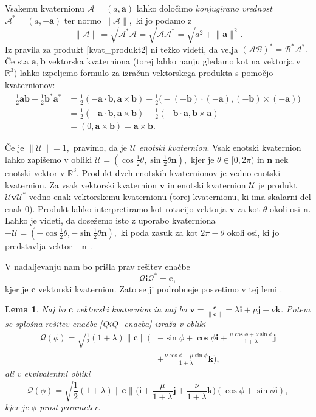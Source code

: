 \documentclass[12pt,a4paper,twoside]{article}
\theoremstyle{definition} %
\theoremstyle{plain} %
\newtheorem{lema}[definicija]{Lema}
\theoremstyle{primerstyle}
\numberwithin{equation}{section}  %
\newcommand{\R}{\mathbb R}
\newcommand{\aV}{\mathbf{a}}
\newcommand{\bV}{\mathbf{b}}
\newcommand{\cV}{\mathbf{c}}
\newcommand{\nV}{\mathbf{n}}
\newcommand{\iV}{\mathbf{i}}
\newcommand{\jV}{\mathbf{j}}
\newcommand{\kV}{\mathbf{k}}
\newcommand{\vV}{\mathbf{v}}
\newcommand{\AQ}{\mathcal{A}}
\newcommand{\BQ}{\mathcal{B}}
\newcommand{\QQ}{\mathcal{Q}}
\newcommand{\UQ}{\mathcal{U}}
\begin{document}
Vsakemu kvaternionu $\AQ=(a,\aV)$ lahko določimo \emph{konjugirano vrednost} $\AQ^*=(a,-\aV)$ ter normo $\lVert\AQ\rVert,$ ki jo podamo z
\begin{equation}
	\label{kvat_norma}
	\lVert\AQ\rVert=\sqrt{\AQ^*\AQ}=\sqrt{\AQ\AQ^*}=\sqrt{a^2+\lVert\aV\rVert^2}.
\end{equation}
Iz pravila za produkt \eqref{kvat_produkt2} ni težko videti, da velja $(\AQ\BQ)^*=\BQ^*\AQ^*.$ Če sta $\aV,\bV$ vektorska kvaterniona (torej lahko nanju gledamo kot na vektorja v $\R^3$) lahko izpeljemo formulo za izračun vektorskega produkta s pomočjo kvaternionov:
\begin{align}
	\frac{1}{2}\aV\bV-\frac{1}{2}\bV^*\aV^*&=\frac{1}{2}(-\aV\cdot\bV,\aV\times\bV)-\frac{1}{2}\big(-(-\bV)\cdot(-\aV),(-\bV)\times(-\aV)\big)\nonumber\\
	&=\frac{1}{2}(-\aV\cdot\bV,\aV\times\bV)-\frac{1}{2}(-\bV\cdot\aV,\bV\times\aV)\label{kvat_vekt_prod}\\
	&=(0,\aV\times\bV)=\aV\times\bV.\nonumber
\end{align}

Če je $\lVert\UQ\rVert=1,$ pravimo, da je $\UQ$ \emph{enotski kvaternion}. Vsak enotski kvaternion lahko zapišemo v obliki $\UQ=(\cos\frac{1}{2}\theta,\sin\frac{1}{2}\theta\nV),$ kjer je $\theta\in[0,2\pi)$ in $\nV$ nek enotski vektor v $\R^3.$ Produkt dveh enotskih kvaternionov je vedno enotski kvaternion. Za vsak vektorski kvaternion $\vV$ in enotski kvaternion $\UQ$ je produkt $\UQ\vV\UQ^*$ vedno enak vektorskemu kvaternionu (torej kvaternionu, ki ima skalarni del enak 0). Produkt lahko interpretiramo kot rotacijo vektorja $\vV$ za kot $\theta$ okoli osi $\nV.$ Lahko je videti, da dosežemo isto z uporabo kvaterniona $-\UQ=(-\cos\frac{1}{2}\theta,-\sin\frac{1}{2}\theta\nV),$ ki poda zasuk za kot $2\pi-\theta$ okoli osi, ki jo predstavlja vektor $-\nV$ \cite[str. 387]{faroukietal2004}.

V nadaljevanju nam bo prišla prav rešitev enačbe
\begin{equation}
	\label{QiQ_enacba}
	\QQ\iV\QQ^*=\cV,
\end{equation}
kjer je $\cV$ vektorski kvaternion. Zato se ji podrobneje posvetimo v tej lemi \cite[poglavje 3.2]{farouki2002hermite}.
\begin{lema}
	\label{QiQ_enacba_lema}
	Naj bo $\cV$ vektorski kvaternion in naj bo $\vV=\frac{\cV}{\lVert\cV\rVert}=\lambda\iV+\mu\jV+\nu\kV$. Potem se splošna rešitev enačbe \eqref{QiQ_enacba} izraža v obliki
	\begin{align}
		\QQ(\phi)=\sqrt{\frac{1}{2}(1+\lambda)\lVert\cV\rVert}\Big(&-\sin\phi+\cos\phi\iV+\frac{\mu\cos\phi+\nu\sin\phi}{1+\lambda}\jV\nonumber\\
		&+\frac{\nu\cos\phi-\mu\sin\phi}{1+\lambda}\kV\Big),\label{QiQ_enacba_resitev}
	\end{align}
	ali v ekvivalentni obliki
	\begin{equation}
		\label{QiQ_enacba_resitev2}
		\QQ(\phi)=\sqrt{\frac{1}{2}(1+\lambda)\lVert\cV\rVert}\Big(\iV+\frac{\mu}{1+\lambda}\jV+\frac{\nu}{1+\lambda}\kV\Big)(\cos\phi+\sin\phi\iV),
	\end{equation}
	kjer je $\phi$ prost parameter.
\end{lema}
\end{document}
